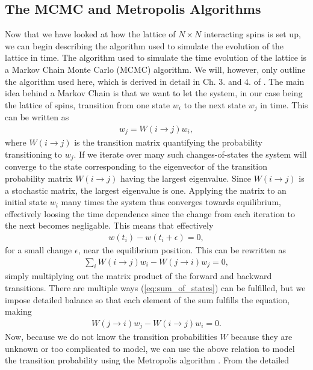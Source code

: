 \documentclass[twocolumn]{aastex62}
\begin{document}
\subsection{The MCMC and Metropolis Algorithms}
Now that we have looked at how the lattice of $N\times N$ interacting spins is set up, we
can begin describing the algorithm used to simulate the evolution of the lattice
in time. The algorithm used to simulate the time evolution of the lattice is a
Markov Chain Monte Carlo (MCMC) algorithm. We will, however, only outline the algorithm
used here, which is derived in detail in Ch. 3. and 4. of \cite{newman:2019}.
The main idea behind a Markov Chain is that we want to let the system, in our
case being the lattice of spins, transition from one state $w_i$ to the next state $w_j$
in time. This can be written as
\begin{align}
	w_j = W(i\to j)w_i,
\end{align}
where $W(i\to j)$ is the transition matrix quantifying the probability
transitioning to $w_j$. If we iterate over many such changes-of-states
the system will converge to the state corresponding to the eigenvector of the
transition probability matrix $W(i\to j)$ having the largest eigenvalue. Since
$W(i\to j)$ is a stochastic matrix, the largest eigenvalue is one. Applying the
matrix to an initial state $w_i$ many times the system thus converges towards equilibrium, effectively loosing the time dependence since the change from each
iteration to the next becomes negligable. This means that effectively
\begin{align}
	w(t_i) - w(t_i + \epsilon) = 0,
\end{align}
for a small change $\epsilon$, near the equilibrium position. This can be
rewritten as
\begin{align}
	\sum_i W(i \to j)w_i - W(j \to i)w_j = 0,
	\label{eq:sum_of_states}
\end{align}
simply multiplying out the matrix product of the forward and backward
transitions. There are multiple ways (\ref{eq:sum_of_states}) can be fulfilled,
but we impose detailed balance \citep[Ch. 3. and 4.]{newman:2019} so that each element of the sum
fulfills the equation, making
\begin{align}
	W(j \to i)w_j - W(i \to j)w_i = 0.
\end{align}
Now, because we do not know the transition probabilities $W$ because they are
unknown or too complicated to model, we can use the above relation to model the transition
probability using the Metropolis algorithm \citep[Ch. 3. and 4.]{newman:2019}. From the detailed
\end{document}
